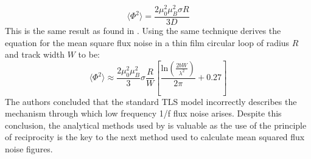 \begin{equation}
    \langle \Phi^2 \rangle = \frac{2\mu_0^2\mu_B^2\sigma R}{3D} 
    \label{eq:MSFNfinal}
\end{equation}
This is the same result as found in \cite{KochModel}. Using the same technique \cite{KochModel} derives the equation for the mean square flux noise in a thin film circular loop of radius $R$ and track width $W$ to be:
\begin{equation}
    \langle \Phi^2 \rangle \approx \frac{2\mu_0^2\mu_B^2}{3}\sigma\frac{R}{W}[\frac{\text{ln}(\frac{2bW}{\lambda^2}) }{2\pi}+ 0.27] 
    \label{eq:ThinFilmMSFN}
\end{equation}
The authors concluded that the standard TLS model incorrectly describes the mechanism through which low frequency 1/f flux noise arises. Despite this conclusion, the analytical methods used by \cite{KochModel} is valuable as the use of the principle of reciprocity is the key to the next method used to calculate mean squared flux noise figures.

